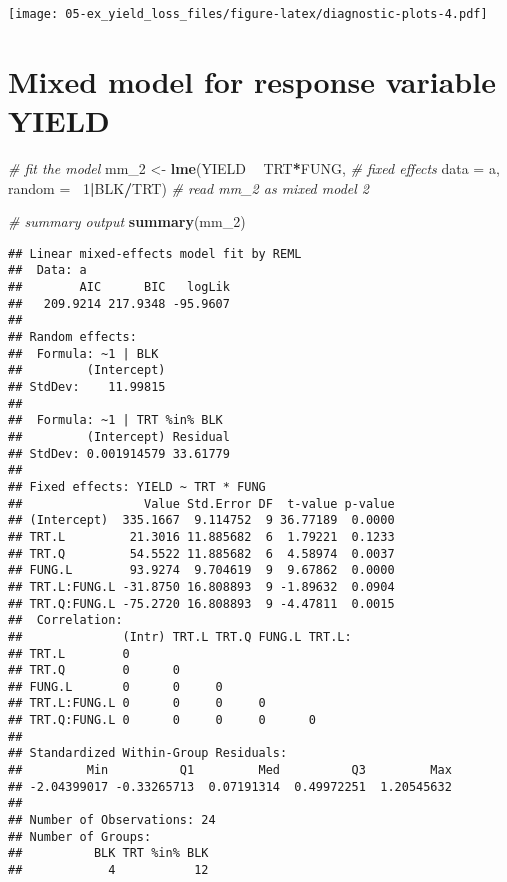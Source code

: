 \documentclass[]{book}
\newenvironment{Shaded}{\begin{snugshade}}{\end{snugshade}}
\newcommand{\CommentTok}[1]{\textcolor[rgb]{0.56,0.35,0.01}{\textit{#1}}}
\newcommand{\DataTypeTok}[1]{\textcolor[rgb]{0.13,0.29,0.53}{#1}}
\newcommand{\DecValTok}[1]{\textcolor[rgb]{0.00,0.00,0.81}{#1}}
\newcommand{\KeywordTok}[1]{\textcolor[rgb]{0.13,0.29,0.53}{\textbf{#1}}}
\newcommand{\NormalTok}[1]{#1}
\newcommand{\OperatorTok}[1]{\textcolor[rgb]{0.81,0.36,0.00}{\textbf{#1}}}
\newcommand{\StringTok}[1]{\textcolor[rgb]{0.31,0.60,0.02}{#1}}
\begin{document}
\texttt{[image: 05-ex\_yield\_loss\_files/figure-latex/diagnostic-plots-4.pdf]}

\hypertarget{mixed-model-for-response-variable-yield}{%
\section{Mixed model for response variable YIELD}\label{mixed-model-for-response-variable-yield}}

\begin{Shaded}
\begin{Highlighting}[]
\CommentTok{# fit the model  }
\NormalTok{mm_}\DecValTok{2}\NormalTok{ <-}\StringTok{ }\KeywordTok{lme}\NormalTok{(YIELD }\OperatorTok{~}\StringTok{ }\NormalTok{TRT}\OperatorTok{*}\NormalTok{FUNG, }\CommentTok{# fixed effects}
            \DataTypeTok{data =}\NormalTok{ a,}
            \DataTypeTok{random =} \OperatorTok{~}\DecValTok{1}\OperatorTok{|}\NormalTok{BLK}\OperatorTok{/}\NormalTok{TRT) }\CommentTok{# read mm_2 as mixed model 2}

\CommentTok{# summary output}
\KeywordTok{summary}\NormalTok{(mm_}\DecValTok{2}\NormalTok{)}
\end{Highlighting}
\end{Shaded}

\begin{verbatim}
## Linear mixed-effects model fit by REML
##  Data: a 
##        AIC      BIC   logLik
##   209.9214 217.9348 -95.9607
## 
## Random effects:
##  Formula: ~1 | BLK
##         (Intercept)
## StdDev:    11.99815
## 
##  Formula: ~1 | TRT %in% BLK
##         (Intercept) Residual
## StdDev: 0.001914579 33.61779
## 
## Fixed effects: YIELD ~ TRT * FUNG 
##                 Value Std.Error DF  t-value p-value
## (Intercept)  335.1667  9.114752  9 36.77189  0.0000
## TRT.L         21.3016 11.885682  6  1.79221  0.1233
## TRT.Q         54.5522 11.885682  6  4.58974  0.0037
## FUNG.L        93.9274  9.704619  9  9.67862  0.0000
## TRT.L:FUNG.L -31.8750 16.808893  9 -1.89632  0.0904
## TRT.Q:FUNG.L -75.2720 16.808893  9 -4.47811  0.0015
##  Correlation: 
##              (Intr) TRT.L TRT.Q FUNG.L TRT.L:
## TRT.L        0                               
## TRT.Q        0      0                        
## FUNG.L       0      0     0                  
## TRT.L:FUNG.L 0      0     0     0            
## TRT.Q:FUNG.L 0      0     0     0      0     
## 
## Standardized Within-Group Residuals:
##         Min          Q1         Med          Q3         Max 
## -2.04399017 -0.33265713  0.07191314  0.49972251  1.20545632 
## 
## Number of Observations: 24
## Number of Groups: 
##          BLK TRT %in% BLK 
##            4           12
\end{verbatim}
\end{document}
